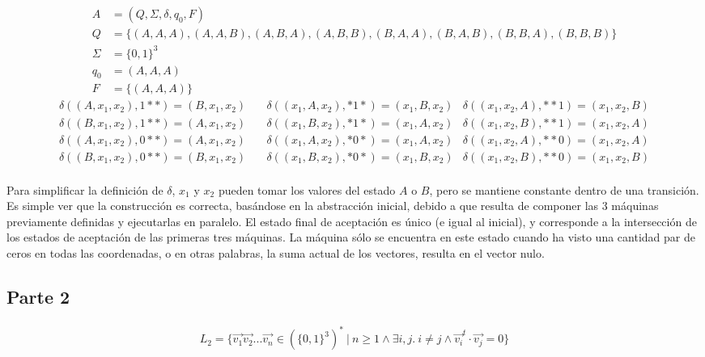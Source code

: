 \documentclass[letter]{article}
\begin{document}
\begin{pregunta}{2}
\begin{align*}
    A & = (Q, \Sigma, \delta, q_0, F) \\
    Q & = \{ (A, A, A), (A, A, B), (A, B, A), (A, B, B), (B, A, A), (B, A, B), (B, B, A), (B, B, B) \} \\
    \Sigma & = \{ 0, 1 \}^3 \\
    q_0 & = (A, A, A) \\
    F & = \{ (A, A, A) \}
\end{align*}
\begin{align*}
    \delta((A, x_1, x_2), 1**) = (B, x_1, x_2) & \quad \delta((x_1, A, x_2), *1*) = (x_1, B, x_2) & \delta((x_1, x_2, A), **1) = (x_1, x_2, B) \\
    \delta((B, x_1, x_2), 1**) = (A, x_1, x_2) & \quad \delta((x_1, B, x_2), *1*) = (x_1, A, x_2) & \delta((x_1, x_2, B), **1) = (x_1, x_2, A) \\
    \delta((A, x_1, x_2), 0**) = (A, x_1, x_2) & \quad \delta((x_1, A, x_2), *0*) = (x_1, A, x_2) & \delta((x_1, x_2, A), **0) = (x_1, x_2, A) \\
    \delta((B, x_1, x_2), 0**) = (B, x_1, x_2) & \quad \delta((x_1, B, x_2), *0*) = (x_1, B, x_2) & \delta((x_1, x_2, B), **0) = (x_1, x_2, B) \\
\end{align*}

Para simplificar la definición de $\delta$, $x_1$ y $x_2$ pueden tomar los valores del estado $A$ o $B$, pero se mantiene constante dentro de una transición. Es simple ver que la construcción es correcta, basándose en la abstracción inicial, debido a que resulta de componer las 3 máquinas previamente definidas y ejecutarlas en paralelo. El estado final de aceptación es único (e igual al inicial), y corresponde a la intersección de los estados de aceptación de las primeras tres máquinas. La máquina sólo se encuentra en este estado cuando ha visto una cantidad par de ceros en todas las coordenadas, o en otras palabras, la suma actual de los vectores, resulta en el vector nulo.


\subsection*{Parte 2}


\begin{align*}
    L_2 = \{ \vec{v_1} \vec{v_2} ... \vec{v_n} \in (\{0, 1\}^3)^* \ \vert \ n \geq 1 \land \exists i, j. \ i \neq j \land \vec{v_i}^t \cdot \vec{v_j} = 0 \}
\end{align*}



\end{pregunta}
\end{document}

